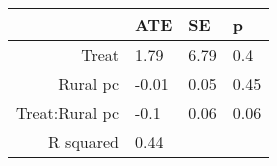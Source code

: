 \begin{tabular}{rlll}
  \hline
 & ATE & SE & p \\ 
  \hline
Treat & 1.79 & 6.79 & 0.4 \\ 
  Rural pc & -0.01 & 0.05 & 0.45 \\ 
  Treat:Rural pc & -0.1 & 0.06 & 0.06 \\ 
  R squared & 0.44 &  &  \\ 
   \hline
\end{tabular}

